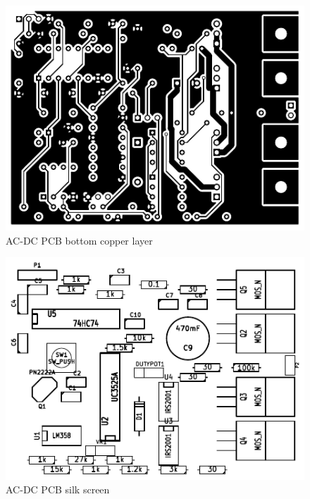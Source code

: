 \documentclass[final]{scrreprt} %
\begin{document}
\begin{figure}[h]
	\begin{center}
		\includegraphics[width=\linewidth/2]{resources/DC-AC-B_CU-rc.pdf}
	\end{center}
	\caption{AC-DC PCB bottom copper layer}
	\label{fig:PCBcopperBottom}
\end{figure}

\begin{figure}[h]
	\begin{center}
		\includegraphics[width=\linewidth/2]{resources/DC-AC-F_SilkS-rc.pdf}
	\end{center}
	\caption{AC-DC PCB silk screen}
	\label{fig:PCBcomponents}
\end{figure}
\end{document}
